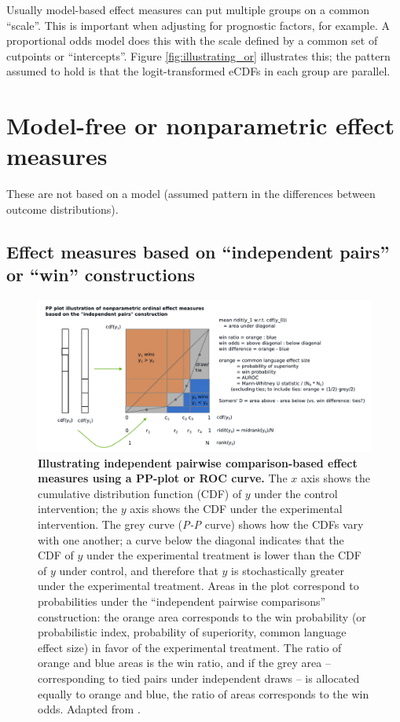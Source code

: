\documentclass[
  11pt,
  fleqn
]{article}
\begin{document}
Usually model-based effect measures can put multiple groups on a
common ``scale''. This is important when adjusting for prognostic
factors, for example.
A proportional odds model does this with the scale defined by a
common set of cutpoints
or ``intercepts''.
Figure \ref{fig:illustrating_or} illustrates this; the pattern
assumed to hold is
that the logit-transformed eCDFs in each group are parallel.

\section{Model-free or nonparametric effect measures}

These are not based on a model (assumed pattern in the differences
between outcome distributions).

\subsection{Effect measures based on ``independent pairs'' or
``win'' constructions}

\begin{figure}
  \includegraphics[width=7in]{effect_measures_pp_plot.pdf}
  \caption{\textbf{Illustrating independent pairwise comparison-based effect
    measures using a PP-plot or ROC curve.}
    The $x$ axis shows the
    cumulative distribution function (CDF) of $y$ under the control
    intervention; the $y$ axis shows the CDF under the experimental
    intervention. The grey
    curve (\emph{P-P} curve) shows how the CDFs vary with one
    another; a curve below the diagonal indicates that the CDF of $y$
    under the experimental treatment is lower than the CDF of $y$
    under control, and therefore that $y$ is stochastically greater
    under the experimental treatment. Areas in the plot correspond to
    probabilities under
    the ``independent pairwise comparisons'' construction: the orange
    area corresponds to the win probability (or probabilistic index,
    probability of superiority, common language effect size) in favor
    of the experimental treatment. The ratio of orange and blue areas
    is the win ratio, and if the grey area -- corresponding to tied
    pairs under independent draws -- is allocated equally to orange
    and blue, the ratio of areas corresponds to the win odds.
    Adapted from
  \citet{smithsonReceiverOperatingCharacteristic2023}.}
  \label{fig:illustrating_pairwise_comparisons}
\end{figure}
\end{document}
